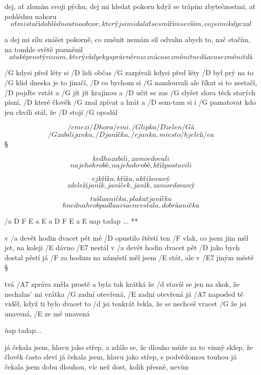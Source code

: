 dej, ať zlomím svoji pýchu, dej mi hledat pokoru
když se trápím zbytečnostmi, ať pohlédnu nahoru
\[ ať mi stačí dohlédnout na obzor, který jsi mi dal
ať se smířím se vším, co jsi mi kdy vzal \] \s

a dej mi sílu snášet pokorně, co změnit nemám sil
odvahu abych to, nač stačím, na tomhle světě pozměnil
\[ a také prostý rozum, který vždycky správně rozezná
co se změnit nedá a co se změnit dá \]



/G kdysi před léty si /D lidi občas /G zazpívali
kdysi před léty /D byl prý na to /G klid
dneska je to jinačí, /D co bychom si /G namlouvali
ale říkat si to nestačí, /D pojďte vstát a /G jít
jít krajinou a /D učit se zas /G slyšet slova
těch starých písní, /D které člověk /G znal
zpívat a hrát a /D sem-tam si i /G pamatovat
kdo jen chvíli stál, že /D stojí /G opodál




\[ /e mezi /D hora/e mi, /G lipka /D zelen/G á \]
\[ /G zabili janka, /D janíčka, /e janka, miesto /h jeleň/e a \] \S

\[ keď ho zabili, zamordovali \]
\[ na jeho hrobě, na jeho hrobě, kříž postavili \] \s

\[ ej křížu, křížu, ukřižovaný \]
\[ zde leží janík, janíček, janík, zamordovaný \] \s


\[ tu šla anička, plakat janíčka \]
\[ hned na hrob padla a viac nevstala, dobrá anička \]



\R  /{a D F E a E a D F E a E} uap tadap ... **

v /a devět hodin dvacet pět mě /D opustilo štěstí
ten /F vlak, co jsem jím měl jet, na koleji /E dávno /E7 nestál
v /a devět hodin dvacet pět /D jako bych dostal pěstí
já /F za hodinu na náměstí měl jsem /E stát, ale v /E7 jiným městě \S

tvá /A7 zpráva zněla prostě a byla tak krátká
že /d stavíš se jen na skok, že nechalas' mi vrátka
/G zadní otevřená, /E zadní otevřená
já /A7 naposled tě viděl, když ti bylo dvacet
to /d jsi tenkrát řekla, že se nechceš vracet
/G že jsi unavená, /E ze mě unavená

\r uap tadap...

já čekala jsem, hlavu jako střep, a zdálo se, že dlouho
může za to vinný sklep, že člověk často sleví
já čekala jsem, hlavu jako střep, s podvědomou touhou
já čekala jsem dobu dlouhou, víc než dost, kolik přesně, nevím \s


